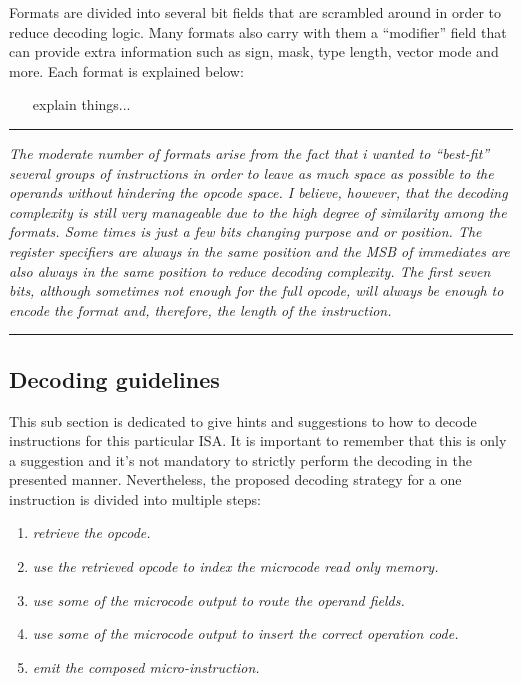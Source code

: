 \documentclass{article}
\begin{document}
            Formats are divided into several bit fields that are scrambled around in order to reduce decoding logic. Many formats also carry with them a ``modifier'' field that can provide extra information such as sign, mask, type length, vector mode and more. Each format is explained below:

            \begin{itemize}

                \item [explain things...]

            \end{itemize} 

        \par\noindent\rule{\textwidth}{0.4pt}
        \textit{The moderate number of formats arise from the fact that i wanted to ``best-fit'' several groups of instructions in order to leave as much space as possible to the operands without hindering the opcode space. I believe, however, that the decoding complexity is still very manageable due to the high degree of similarity among the formats. Some times is just a few bits changing purpose and or position. The register specifiers are always in the same position and the MSB of immediates are also always in the same position to reduce decoding complexity. The first seven bits, although sometimes not enough for the full opcode, will always be enough to encode the format and, therefore, the length of the instruction.}
        \par\noindent\rule{\textwidth}{0.4pt}

        \subsection{Decoding guidelines}    %

            This sub section is dedicated to give hints and suggestions to how to decode instructions for this particular ISA. It is important to remember that this is only a suggestion and it's not mandatory to strictly perform the decoding in the presented manner. Nevertheless, the proposed decoding strategy for a one instruction is divided into multiple steps:

            \begin{enumerate}

                \item \textit{retrieve the opcode.}
                \item \textit{use the retrieved opcode to index the microcode read only memory.}
                \item \textit{use some of the microcode output to route the operand fields.}
                \item \textit{use some of the microcode output to insert the correct operation code.}
                \item \textit{emit the composed micro-instruction.}

            \end{enumerate}
\end{document}
